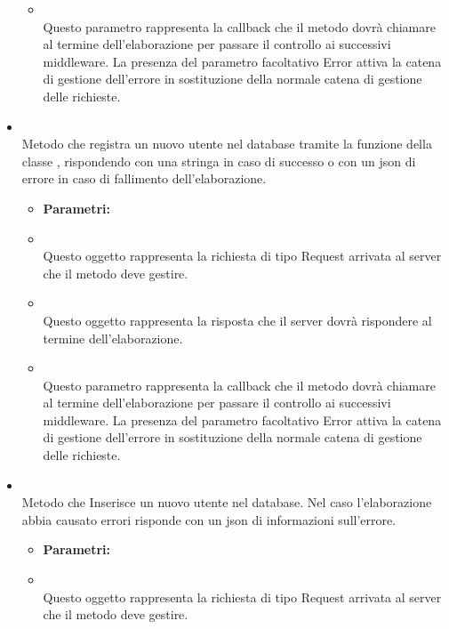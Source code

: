\begin{itemize}
\begin{itemize}
						\item[]  \\ Questo parametro rappresenta la callback che il metodo dovrà chiamare al termine dell'elaborazione per passare il controllo ai successivi middleware. La presenza del parametro facoltativo Error attiva la catena di gestione dell'errore in sostituzione della normale catena di gestione delle richieste.	
				\end{itemize}
					\item[] \textbf{} \\ Metodo che registra un nuovo utente nel database tramite la funzione  della classe , rispondendo con una stringa in caso di successo o con un json di errore in caso di fallimento dell'elaborazione.
						\begin{itemize}\addtolength{\itemsep}{-0.5\baselineskip}
						\item[] \textbf{Parametri:}
						\item[]  \\ Questo oggetto rappresenta la richiesta di tipo Request arrivata al server che il metodo deve gestire.	
						\item[]  \\ Questo oggetto rappresenta la risposta che il server dovrà rispondere al termine dell'elaborazione.	
						\item[]  \\ Questo parametro rappresenta la callback che il metodo dovrà chiamare al termine dell'elaborazione per passare il controllo ai successivi middleware. La presenza del parametro facoltativo Error attiva la catena di gestione dell'errore in sostituzione della normale catena di gestione delle richieste.	
				\end{itemize}
					\item[] \textbf{} \\ Metodo che Inserisce un nuovo utente nel database. Nel caso l'elaborazione abbia causato errori risponde con un json di informazioni sull'errore.
						\begin{itemize}\addtolength{\itemsep}{-0.5\baselineskip}
						\item[] \textbf{Parametri:}
						\item[]  \\ Questo oggetto rappresenta la richiesta di tipo Request arrivata al server che il metodo deve gestire.	

\end{itemize}
\end{itemize}
